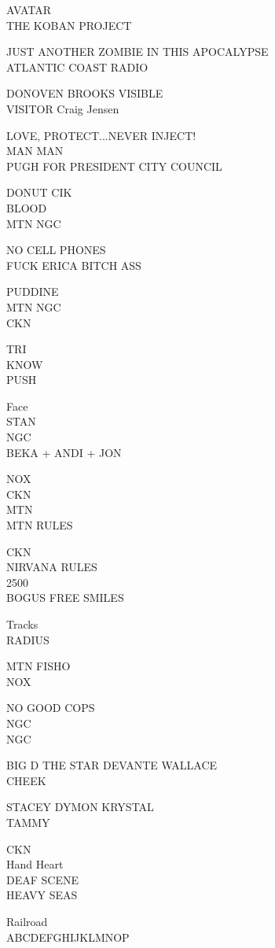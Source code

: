 \documentclass[10pt,letterpaper]{article}
\begin{document}
AVATAR\\
THE KOBAN PROJECT

JUST ANOTHER ZOMBIE IN THIS APOCALYPSE\\
ATLANTIC COAST RADIO

DONOVEN BROOKS VISIBLE\\
VISITOR Craig Jensen

LOVE, PROTECT...NEVER INJECT!\\
MAN MAN\\
PUGH FOR PRESIDENT CITY COUNCIL

DONUT CIK\\
BLOOD\\
MTN NGC

NO CELL PHONES\\
FUCK ERICA BITCH ASS

PUDDINE\\
MTN NGC\\
CKN

TRI\\
KNOW\\
PUSH

Face\\
STAN\\
NGC\\
BEKA + ANDI + JON

NOX\\
CKN\\
MTN\\
MTN RULES

CKN\\
NIRVANA RULES\\
2500\\
BOGUS FREE SMILES

Tracks\\
RADIUS

MTN FISHO\\
NOX

NO GOOD COPS\\
NGC\\
NGC

BIG D THE STAR DEVANTE WALLACE\\
CHEEK

STACEY DYMON KRYSTAL\\
TAMMY

CKN\\
Hand Heart\\
DEAF SCENE\\
HEAVY SEAS

Railroad\\
ABCDEFGHIJKLMNOP
\end{document}
